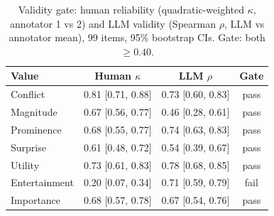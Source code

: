 \begin{table}[t]
\centering
\caption{Validity gate: human reliability (quadratic-weighted $\kappa$, annotator 1 vs 2) and LLM validity (Spearman $\rho$, LLM vs annotator mean), 99 items, 95\% bootstrap CIs. Gate: both $\ge 0.40$.}
\label{tab:validity}
\setlength{\tabcolsep}{4pt}
\begin{tabular}{lccc}
\toprule
Value & Human $\kappa$ & LLM $\rho$ & Gate \\
\midrule
Conflict      & 0.81 [0.71, 0.88] & 0.73 [0.60, 0.83] & pass \\
Magnitude     & 0.67 [0.56, 0.77] & 0.46 [0.28, 0.61] & pass \\
Prominence    & 0.68 [0.55, 0.77] & 0.74 [0.63, 0.83] & pass \\
Surprise      & 0.61 [0.48, 0.72] & 0.54 [0.39, 0.67] & pass \\
Utility       & 0.73 [0.61, 0.83] & 0.78 [0.68, 0.85] & pass \\
Entertainment & 0.20 [0.07, 0.34] & 0.71 [0.59, 0.79] & fail \\
Importance    & 0.68 [0.57, 0.78] & 0.67 [0.54, 0.76] & pass \\
\bottomrule
\end{tabular}
\end{table}
